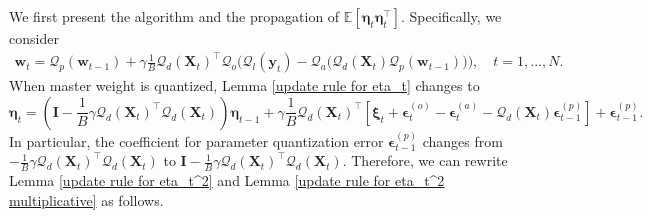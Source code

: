 \documentclass[11pt, letterpaper]{article}
\begin{document}
We first present the algorithm and the propagation of $\mathbb{E}\left[\boldsymbol{\eta}_t\boldsymbol{\eta}_t^\top\right]$.
Specifically, we consider
\begin{align}
    \mathbf{w}_t=\mathcal{Q}_p(\mathbf{w}_{t-1})+\gamma \frac{1}{B} \mathcal{Q}_d(\mathbf{X}_t)^\top \mathcal{Q}_o\Big(\mathcal{Q}_l(\mathbf{y}_t)-\mathcal{Q}_a\big(\mathcal{Q}_d(\mathbf{X}_t)\mathcal{Q}_p(\mathbf{w}_{t-1})\big)\Big), \quad t=1,...,N.
\end{align}
When master weight is quantized, Lemma \ref{update rule for eta_t} changes to
\begin{equation}
    \label{eq: F2}
    \boldsymbol{\eta}_t = \left(\mathbf{I}-\frac{1}{B}\gamma {\mathcal{Q}_d(\mathbf{X}_t)}^\top \mathcal{Q}_d(\mathbf{X}_t) \right)\boldsymbol{\eta}_{t-1}+\gamma\frac{1}{B}{\mathcal{Q}_d(\mathbf{X}_t)}^\top \left[\boldsymbol{\xi}_t+\boldsymbol{\epsilon}_t^{(o)}-\boldsymbol{\epsilon}_t^{(a)}-\mathcal{Q}_d(\mathbf{X}_t)\boldsymbol{\epsilon}_{t-1}^{(p)}\right]+\boldsymbol{\epsilon}_{t-1}^{(p)}.
\end{equation}
In particular, the coefficient for parameter quantization error $\boldsymbol{\epsilon}_{t-1}^{(p)}$ changes from $-\frac{1}{B}\gamma {\mathcal{Q}_d(\mathbf{X}_t)}^\top \mathcal{Q}_d(\mathbf{X}_t)$ to $\mathbf{I}-\frac{1}{B}\gamma {\mathcal{Q}_d(\mathbf{X}_t)}^\top \mathcal{Q}_d(\mathbf{X}_t)$. Therefore, we can rewrite Lemma \ref{update rule for eta_t^2} and Lemma \ref{update rule for eta_t^2 multiplicative} as follows.
\end{document}
